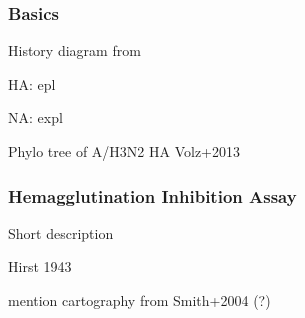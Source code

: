 \documentclass[12pt]{article}
\begin{document}

    \subsubsection{Basics}

      History diagram from \citep{alberts15}

      HA: epl

      NA: expl

      Phylo tree of A/H3N2 HA Volz+2013

    \subsubsection{Hemagglutination Inhibition Assay}

      Short description

      Hirst 1943

      mention cartography from Smith+2004 (?)
\end{document}
